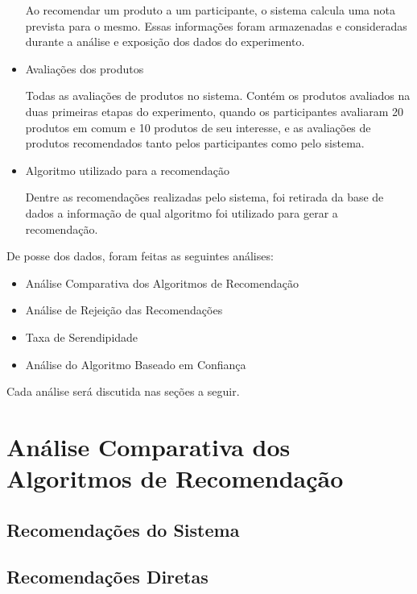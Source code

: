 \begin{itemize}
	\subitem Ao recomendar um produto a um participante, o sistema calcula uma nota prevista para o mesmo. Essas informações foram armazenadas e consideradas durante a análise e exposição dos dados do experimento.
	
	\item Avaliações dos produtos
	
	\subitem Todas as avaliações de produtos no sistema. Contém os produtos avaliados na duas primeiras etapas do experimento, quando os participantes avaliaram 20 produtos em comum e 10 produtos de seu interesse, e as avaliações de produtos recomendados tanto pelos participantes como pelo sistema.
	
	\item Algoritmo utilizado para a recomendação
	
	\subitem Dentre as recomendações realizadas pelo sistema, foi retirada da base de dados a informação de qual algoritmo foi utilizado para gerar a recomendação.
	
\end{itemize}

 De posse dos dados, foram feitas as seguintes análises:
 
\begin{itemize}
	\item Análise Comparativa dos Algoritmos de Recomendação
	\item Análise de Rejeição das Recomendações
	\item Taxa de Serendipidade
	\item Análise do Algoritmo Baseado em Confiança
\end{itemize}

 Cada análise será discutida nas seções a seguir.
 
\section{Análise Comparativa dos Algoritmos de Recomendação}
\label{sec:analise_comparativa_dos_algoritmos_de_recomendacao}
 
\subsection{Recomendações do Sistema}

\subsection{Recomendações Diretas}

